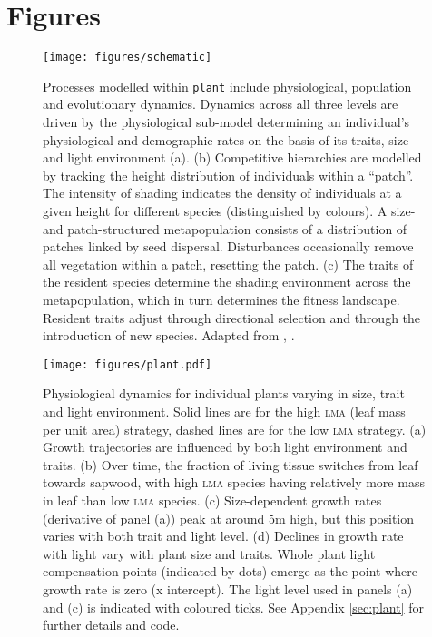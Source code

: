 \documentclass[a4paper,11pt]{article}
\newcommand{\plant}{\texttt{plant}}
\begin{document}
\clearpage


\clearpage

\section{Figures}\label{figures}

\begin{figure}[h!]
\centering
\texttt{[image: figures/schematic]}

\caption{Processes modelled within {\plant} include physiological, population and
evolutionary dynamics.
Dynamics across all three levels are driven by the
physiological sub-model determining an individual's physiological and
demographic rates on the basis of its traits, size and light environment (a).
(b) Competitive hierarchies  are modelled by tracking the height distribution of
individuals within a ``patch''. The intensity
of shading indicates the density of individuals at a given height for
different species (distinguished by colours). A size- and patch-structured
metapopulation consists of a distribution of patches linked by seed dispersal.
Disturbances occasionally remove all vegetation within a patch, resetting the
patch. (c) The traits of the resident species determine the shading environment
across the metapopulation, which in turn determines the fitness landscape.
Resident traits adjust through directional selection
and through the introduction of new species. Adapted from
\citet{Falster-2011}, \citet{Falster-2015}. }

\label{fig:schematic}
\end{figure}

\newpage

\begin{figure}[h!]
\centering
\texttt{[image: figures/plant.pdf]}
\caption{Physiological dynamics for individual plants varying in size,
  trait and light environment. Solid lines are for the high
  \textsc{lma} (leaf mass per unit area) strategy, dashed lines are
  for the low \textsc{lma} strategy.  (a) Growth trajectories are
  influenced by both light environment and traits.  (b) Over time, the
  fraction of living tissue switches from leaf towards sapwood, with
  high \textsc{lma} species having relatively more mass in leaf than
  low \textsc{lma} species. (c) Size-dependent growth rates
  (derivative of panel (a)) peak at around 5m high, but this position
  varies with both trait and light level.  (d) Declines in growth rate
  with light vary with plant size and traits.  Whole plant light
  compensation points (indicated by dots) emerge as the point where
  growth rate is zero (x intercept).  The light level used in panels
  (a) and (c) is indicated with coloured ticks.  See Appendix
  \ref{sec:plant} for further details and code.}
\label{fig:plant}
\end{figure}
\end{document}
